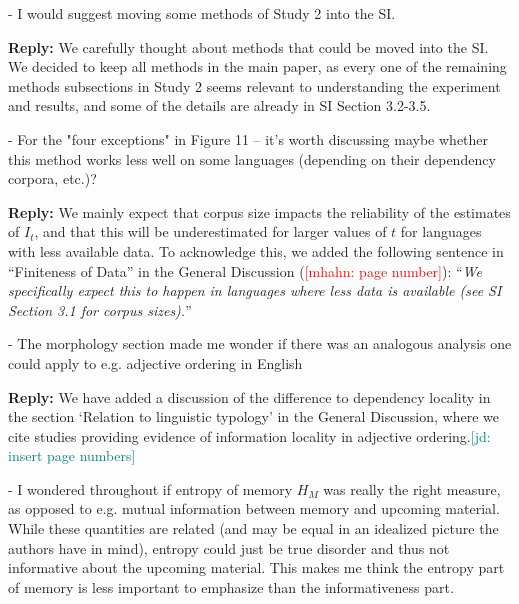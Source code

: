 \documentclass{article}[11pt,a4paper,oneside]
\newcommand\mhahn[1]{\textcolor{red}{[mhahn: #1]}}
\newcommand\jd[1]{\textcolor{teal}{[jd: #1]}}
\newenvironment{reply}
  {\par\medskip
   \color{blue}%
   \begin{framed}
   \textbf{Reply: }\ignorespaces}
 {\end{framed}
  \medskip}
\begin{document}
- I would suggest moving some methods of Study 2 into the SI.

\begin{reply}
We carefully thought about methods that could be moved into the SI. We decided to keep all methods in the main paper, as every one of the remaining methods subsections in Study 2 seems relevant to understanding the experiment and results, and some of the details are already in SI Section 3.2-3.5.
\end{reply}

- For the "four exceptions" in Figure 11 -- it's worth discussing maybe whether this method works less well on some languages (depending on their dependency corpora, etc.)?

\begin{reply}
We mainly expect that corpus size impacts the reliability of the estimates of $I_t$, and that this will be underestimated for larger values of $t$ for languages with less available data.
	To acknowledge this, we added the following sentence in ``Finiteness of Data'' in the General Discussion (\mhahn{page number}): ``\textit{We specifically expect this to happen in languages where less data is available (see SI Section 3.1 for corpus sizes).}''
\end{reply}

- The morphology section made me wonder if there was an analogous analysis one could apply to e.g. adjective ordering in English

\begin{reply}
We have added a discussion of the difference to dependency locality in the section `Relation to linguistic typology' in the General Discussion, where we cite studies providing evidence of information locality in adjective ordering.\jd{insert page numbers}
\end{reply}

- I wondered throughout if entropy of memory $H_M$ was really the right measure, as opposed to e.g. mutual information between memory and upcoming material. While these quantities are related (and may be equal in an idealized picture the authors have in mind), entropy could just be true disorder and thus not informative about the upcoming material. This makes me think the entropy part of memory is less important to emphasize than the informativeness part.
\end{document}
